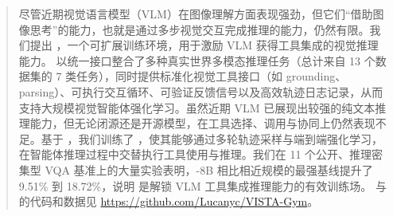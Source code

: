 \begin{abstract}
尽管近期视觉语言模型（VLM）在图像理解方面表现强劲，但它们“借助图像思考”的能力，也就是通过多步视觉交互完成推理的能力，仍然有限。我们提出 \env{}，一个可扩展训练环境，用于激励 VLM 获得工具集成的视觉推理能力。\env{} 以统一接口整合了多种真实世界多模态推理任务（总计来自 13 个数据集的 7 类任务），同时提供标准化视觉工具接口（如 grounding、parsing）、可执行交互循环、可验证反馈信号以及高效轨迹日志记录，从而支持大规模视觉智能体强化学习。虽然近期 VLM 已展现出较强的纯文本推理能力，但无论闭源还是开源模型，在工具选择、调用与协同上仍然表现不足。基于 \env{}，我们训练了 \ours{}，使其能够通过多轮轨迹采样与端到端强化学习，在智能体推理过程中交替执行工具使用与推理。我们在 11 个公开、推理密集型 VQA 基准上的大量实验表明，\ours{}-8B 相比相近规模的最强基线提升了 9.51\% 到 18.72\%，说明 \env{} 是解锁 VLM 工具集成推理能力的有效训练场。 \env{} 与 \ours{} 的代码和数据见 \url{https://github.com/Lucanyc/VISTA-Gym}。
\end{abstract}
